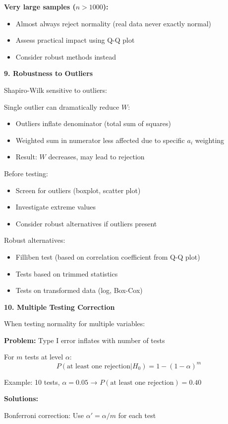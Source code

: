 \documentclass[12pt]{article}
\begin{document}
\begin{explanation}
\textbf{Very large samples ($n > 1000$):}
\begin{itemize}
\item Almost always reject normality (real data never exactly normal)
\item Assess practical impact using Q-Q plot
\item Consider robust methods instead
\end{itemize}

\textbf{9. Robustness to Outliers}

Shapiro-Wilk sensitive to outliers:

Single outlier can dramatically reduce $W$:
\begin{itemize}
\item Outliers inflate denominator (total sum of squares)
\item Weighted sum in numerator less affected due to specific $a_i$ weighting
\item Result: $W$ decreases, may lead to rejection
\end{itemize}

Before testing:
\begin{itemize}
\item Screen for outliers (boxplot, scatter plot)
\item Investigate extreme values
\item Consider robust alternatives if outliers present
\end{itemize}

Robust alternatives:
\begin{itemize}
\item Filliben test (based on correlation coefficient from Q-Q plot)
\item Tests based on trimmed statistics
\item Tests on transformed data (log, Box-Cox)
\end{itemize}

\textbf{10. Multiple Testing Correction}

When testing normality for multiple variables:

\textbf{Problem:} Type I error inflates with number of tests

For $m$ tests at level $\alpha$:
\[P(\text{at least one rejection} | H_0) = 1 - (1-\alpha)^m\]

Example: 10 tests, $\alpha = 0.05$ → $P(\text{at least one rejection}) = 0.40$

\textbf{Solutions:}

Bonferroni correction: Use $\alpha' = \alpha/m$ for each test


\end{explanation}
\end{document}
